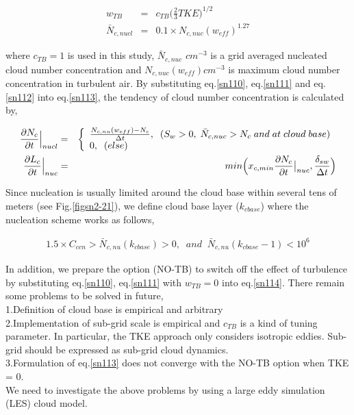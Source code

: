 \begin{eqnarray}
w_{TB}&=&c_{TB}\bigl(\frac{2}{3}TKE\bigr)^{1/2}\label{sn112}\\
\bar{N}_{c,nucl}&=&0.1\times N_{c,nuc}(w_{eff})^{1.27}\label{sn113}
\end{eqnarray}

where $c_{TB} = 1$ is used in this study, $\bar{N}_{c,nuc}$ $cm^{-3}$ is a grid averaged nucleated cloud number concentration and $N_{c,nuc}(w_{eff}) cm^{-3}$ is maximum cloud number concentration in turbulent air. By substituting eq.\ref{sn110}, eq.\ref{sn111} and eq.\ref{sn112} into eq.\ref{sn113}, the tendency of cloud number concentration is calculated by,

\begin{eqnarray}
\frac{\partial N_{c}}{\partial t}\Bigr|_{nucl}&=&
\left\{
\begin{array}{l}
\frac{N_{c,nu}(w_{eff})-N_{c}}{\Delta t},\;\;(S_{w}>0,\;\bar{N}_{c,nuc}>N_{c}\;and\;at\;cloud\;base) \\
0,\;\;(else) \\
\label{sn114}
\end{array}
\right.\\
\frac{\partial L_{c}}{\partial t}\Bigr|_{nuc}&=&min\Bigl(x_{c,min}\frac{\partial N_{c}}{\partial t}\bigr|_{nuc},\frac{\delta_{sw}}{\Delta t}\Bigr)\label{sn115}
\end{eqnarray}

Since nucleation is usually limited around the cloud base within several tens of meters (see Fig.\ref{figsn2-21}), we define cloud base layer ($k_{cbase}$) where the nucleation scheme works as follows,

\begin{eqnarray}
1.5 \times C_{ccn} > \bar{N}_{c,nu}(k_{cbase})>0,\;\;and\;\;\bar{N}_{c,nu}(k_{cbase}-1) < 10^{6}\label{sn116}
\end{eqnarray}

In addition, we prepare the option (NO-TB) to switch off the effect of turbulence by substituting eq.\ref{sn110}, eq.\ref{sn111} with $w_{TB} = 0$ into eq.\ref{sn114}. There remain some problems to be solved in future,\\
1.Definition of cloud base is empirical and arbitrary\\
2.Implementation of sub-grid scale is empirical and $c_{TB}$ is a kind of tuning parameter. In particular, the TKE approach only considers isotropic eddies. Sub-grid should be expressed as sub-grid cloud dynamics.\\
3.Formulation of eq.\ref{sn113} does not converge with the NO-TB option when TKE = 0.\\
We need to investigate the above problems by using a large eddy simulation (LES) cloud model.

